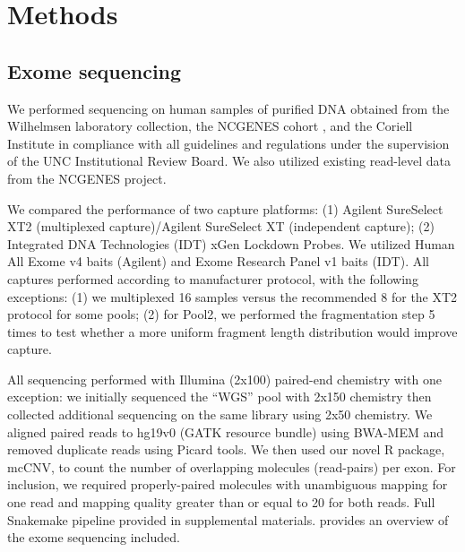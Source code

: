 \documentclass{bmcart}\usepackage[]{graphicx}\usepackage[]{color}
\begin{document}

\section{Methods}

\subsection{Exome sequencing}

We performed sequencing on human samples of purified DNA obtained from the Wilhelmsen laboratory collection, the NCGENES cohort \cite{foreman:2013aa}, and the Coriell Institute in compliance with all guidelines and regulations under the supervision of the UNC Institutional Review Board.
We also utilized existing read-level data from the NCGENES \cite{foreman:2013aa} project.

We compared the performance of two capture platforms: (1) Agilent SureSelect XT2 (multiplexed capture)/Agilent SureSelect XT (independent capture); (2) Integrated DNA Technologies (IDT) xGen Lockdown Probes.
We utilized Human All Exome v4 baits (Agilent) and Exome Research Panel v1 baits (IDT).
All captures performed according to manufacturer protocol, with the following exceptions: (1) we multiplexed 16 samples versus the recommended 8 for the XT2 protocol for some pools; (2) for Pool2, we performed the fragmentation step 5 times to test whether a more uniform fragment length distribution would improve capture.

All sequencing performed with Illumina (2x100) paired-end chemistry with one exception: we initially sequenced the ``WGS'' pool with 2x150 chemistry then collected additional sequencing on the same library using 2x50 chemistry.
We aligned paired reads to hg19v0 (GATK resource bundle) using BWA-MEM \cite{li:2013ab} and removed duplicate reads using Picard tools.
We then used our novel R package, mcCNV, to count the number of overlapping molecules (read-pairs) per exon.
For inclusion, we required properly-paired molecules with unambiguous mapping for one read and mapping quality greater than or equal to 20 for both reads.
Full Snakemake \cite{koster:2012aa} pipeline provided in supplemental materials.
 provides an overview of the exome sequencing included.
\end{document}
